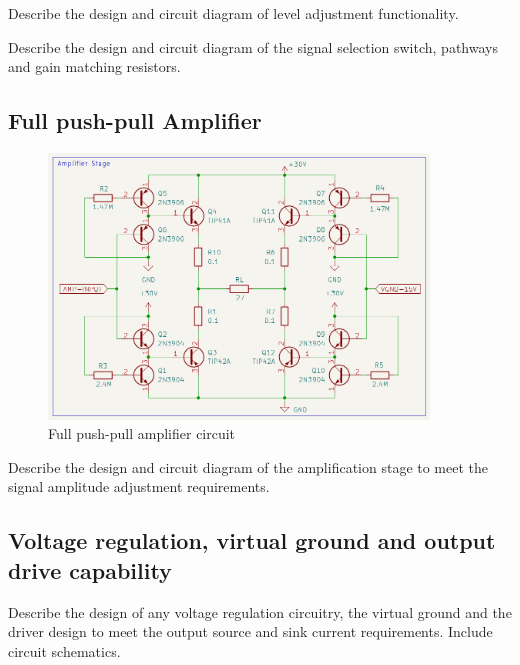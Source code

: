 \documentclass[11pt,a4paper]{article}
\begin{document}
Describe the design and circuit diagram of level adjustment functionality.

Describe the design and circuit diagram of the signal selection switch, pathways and gain matching resistors.


\subsection{Full push-pull Amplifier}

\begin{figure}[H]
	\begin{center}
		\includegraphics[width=0.9\textwidth]{figures/hardware/schematics/amplifier-circuit.png}
		\caption{Full push-pull amplifier circuit}
		\label{fig:full-push-pull-amplifier-circuit}
	\end{center}
\end{figure}


Describe the design and circuit diagram of the amplification stage to meet the signal amplitude adjustment requirements.

\subsection{Voltage regulation, virtual ground and output drive capability}

Describe the design of any voltage regulation circuitry, the virtual ground and the driver design to meet the output source and sink current requirements. Include circuit schematics.

\end{document}
